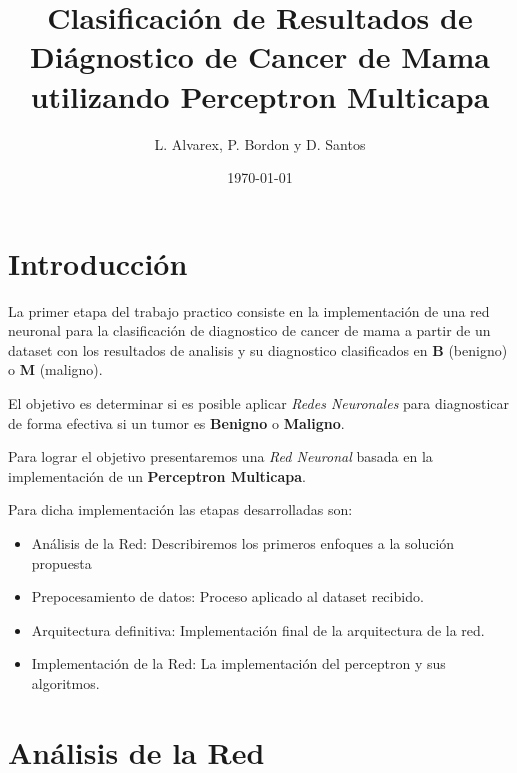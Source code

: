 \documentclass[onecolumn,10pt]{article}
\begin{document}
 

\title{Clasificación de Resultados de Diágnostico de Cancer de Mama utilizando Perceptron Multicapa}

\author{L. Alvarex, P. Bordon y D. Santos}


\date{\today}


\maketitle

\section{Introducción}
La primer etapa del trabajo practico consiste en la implementación
de una red neuronal para la clasificación de diagnostico de cancer
de mama a partir de un dataset con los resultados de analisis y
su diagnostico clasificados en \textbf{B} (benigno) o \textbf{M} (maligno).

El objetivo es determinar si es posible aplicar \emph{Redes Neuronales} para
diagnosticar de forma efectiva si un tumor es \textbf{Benigno} o \textbf{Maligno}.

Para lograr el objetivo presentaremos una \emph{Red Neuronal} basada en la
implementación de un \textbf{Perceptron Multicapa}.

Para dicha implementación las etapas desarrolladas son:

\begin{itemize}
\item Análisis de la Red: Describiremos los primeros enfoques a la
  solución propuesta
\item Prepocesamiento de datos: Proceso aplicado al dataset recibido.
\item Arquitectura definitiva: Implementación final de la arquitectura
  de la red.
\item Implementación de la Red: La implementación del perceptron y sus
   algoritmos.
\end{itemize}


\section{Análisis de la Red}
\end{document}

